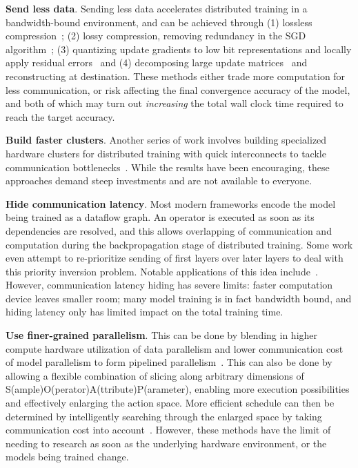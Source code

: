 \noindent\textbf{Send less data}. Sending less data accelerates distributed training in a bandwidth-bound environment, and can be achieved through (1) lossless compression~\cite{burtscher2009fpc}; (2) lossy compression, removing redundancy in the SGD algorithm~\cite{lin2017deep}; (3) quantizing update gradients to low bit representations and locally apply residual errors~\cite{cntk1bt, lim20183lc} and (4) decomposing large update matrices~\cite{projectAdam,poseidon,xie2015distributed} and reconstructing at destination. These methods either trade more computation for less communication, or risk affecting the final convergence accuracy of the model, and both of which may turn out \textit{increasing} the total wall clock time required to reach the target accuracy.

\noindent\textbf{Build faster clusters}. Another series of work involves building specialized hardware clusters for distributed training with quick interconnects to tackle communication bottlenecks~\cite{DBLP:journals/corr/abs-1711-00489, You:2018:ITM:3225058.3225069, DBLP:journals/corr/abs-1711-04325,jia2018highly,DBLP:journals/corr/abs-1811-05233,sun2019optimizing, ImageNetIn1Hour, firecaffe}. While the results have been encouraging, these approaches demand steep investments and are not available to everyone.

\noindent\textbf{Hide communication latency}. Most modern frameworks encode the model being trained as a dataflow graph. An operator is executed as soon as its dependencies are resolved, and this allows overlapping of communication and computation during the backpropagation stage of distributed training. Some work even attempt to re-prioritize sending of first layers over later layers to deal with this priority inversion problem. Notable applications of this idea include~\cite{hashemi2018tictac, prioritybased, poseidon, 10.1145/3341301.3359642}. However, communication latency hiding has severe limits: faster computation device leaves smaller room; many model training is in fact bandwidth bound, and hiding latency only has limited impact on the total training time.

\noindent\textbf{Use finer-grained parallelism}. This can be done by blending in higher compute hardware utilization of data parallelism and lower communication cost of model parallelism to form pipelined parallelism~\cite{harlap2018pipedream}. This can also be done by allowing a flexible combination of slicing along arbitrary dimensions of S(ample)O(perator)A(ttribute)P(arameter), enabling more execution possibilities and effectively enlarging the action space. More efficient schedule can then be determined by intelligently searching through the enlarged space by taking communication cost into account~\cite{jia2018beyond}. However, these methods have the limit of needing to research as soon as the underlying hardware environment, or the models being trained change.

